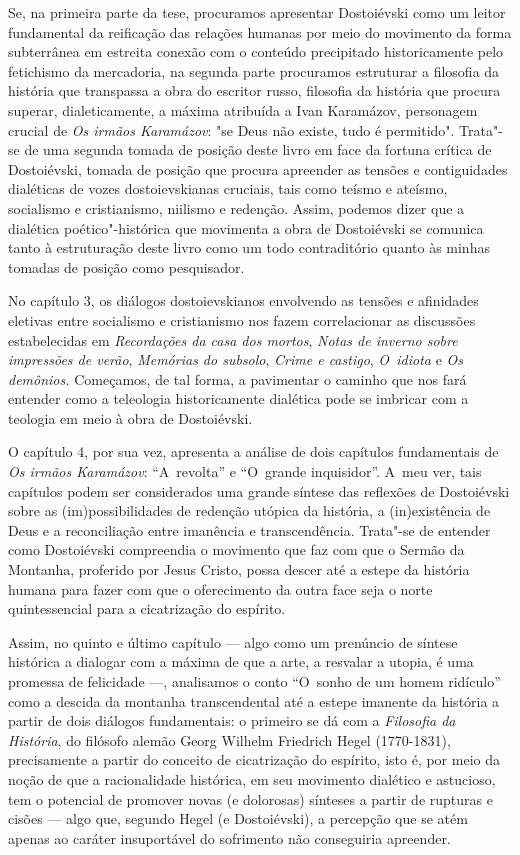 Se, na primeira parte da tese, procuramos apresentar Dostoiévski como um
leitor fundamental da reificação das relações humanas por meio do
movimento da forma subterrânea em estreita conexão com o conteúdo
precipitado historicamente pelo fetichismo da mercadoria, na segunda
parte procuramos estruturar a filosofia da história que transpassa a
obra do escritor russo, filosofia da história que procura superar,
dialeticamente, a máxima atribuída a Ivan Karamázov, personagem crucial
de \emph{Os irmãos Karamázov}: "se Deus não existe, tudo é permitido".
Trata"-se de uma segunda tomada de posição deste livro em face da fortuna
crítica de Dostoiévski, tomada de posição que procura apreender as
tensões e contiguidades dialéticas de vozes dostoievskianas cruciais,
tais como teísmo e ateísmo, socialismo e cristianismo, niilismo e
redenção. Assim, podemos dizer que a dialética poético"-histórica que
movimenta a obra de Dostoiévski se comunica tanto à estruturação deste
livro como um todo contraditório quanto às minhas tomadas de posição
como pesquisador.

No capítulo 3, os diálogos dostoievskianos envolvendo as tensões e
afinidades eletivas entre socialismo e cristianismo nos fazem
correlacionar as discussões estabelecidas em \emph{Recordações da casa
dos mortos}, \emph{Notas de inverno sobre impressões de verão},
\emph{Memórias do subsolo}, \emph{Crime e castigo}, \emph{O~idiota} e
\emph{Os demônios.} Começamos, de tal forma, a pavimentar o caminho que
nos fará entender como a teleologia historicamente dialética pode se
imbricar com a teologia em meio à obra de Dostoiévski.

O capítulo 4, por sua vez, apresenta a análise de dois capítulos
fundamentais de \emph{Os irmãos Karamázov}: ``A~revolta'' e ``O~grande
inquisidor''. A~meu ver, tais capítulos podem ser considerados uma
grande síntese das reflexões de Dostoiévski sobre as (im)possibilidades
de redenção utópica da história, a (in)existência de Deus e a
reconciliação entre imanência e transcendência. Trata"-se de entender
como Dostoiévski compreendia o movimento que faz com que o Sermão da
Montanha, proferido por Jesus Cristo, possa descer até a estepe da
história humana para fazer com que o oferecimento da outra face seja o
norte quintessencial para a cicatrização do espírito.

Assim, no quinto e último capítulo --- algo como um prenúncio de síntese
histórica a dialogar com a máxima de que a arte, a resvalar a utopia, é
uma promessa de felicidade ---, analisamos o conto ``O~sonho de um homem
ridículo'' como a descida da montanha transcendental até a estepe
imanente da história a partir de dois diálogos fundamentais: o primeiro
se dá com a \emph{Filosofia da História}, do filósofo alemão Georg
Wilhelm Friedrich Hegel (1770-1831), precisamente a partir do conceito
de cicatrização do espírito, isto é, por meio da noção de que a
racionalidade histórica, em seu movimento dialético e astucioso, tem o
potencial de promover novas (e dolorosas) sínteses a partir de rupturas
e cisões --- algo que, segundo Hegel (e Dostoiévski), a percepção que se
atém apenas ao caráter insuportável do sofrimento não conseguiria
apreender.

